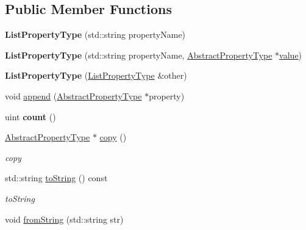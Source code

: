\subsection*{Public Member Functions}
\begin{DoxyCompactItemize}
\item 
\hypertarget{classListPropertyType_a5e6f35179b6e7c79cf7dd831db1f5ffd}{{\bfseries List\-Property\-Type} (std\-::string property\-Name)}\label{classListPropertyType_a5e6f35179b6e7c79cf7dd831db1f5ffd}

\item 
\hypertarget{classListPropertyType_a72d99362f99900b292e0a8e78e9d2d2f}{{\bfseries List\-Property\-Type} (std\-::string property\-Name, \hyperlink{classAbstractPropertyType}{Abstract\-Property\-Type} $\ast$\hyperlink{classAbstractPropertyType_ae723621925382263eba046fa1ca8e36d}{value})}\label{classListPropertyType_a72d99362f99900b292e0a8e78e9d2d2f}

\item 
\hypertarget{classListPropertyType_a97b74dbcac25f0ea6610bfea24916ef6}{{\bfseries List\-Property\-Type} (\hyperlink{classListPropertyType}{List\-Property\-Type} \&other)}\label{classListPropertyType_a97b74dbcac25f0ea6610bfea24916ef6}

\item 
void \hyperlink{classListPropertyType_a18501d9e46af59ee269c6c6473ff0c99}{append} (\hyperlink{classAbstractPropertyType}{Abstract\-Property\-Type} $\ast$property)
\item 
\hypertarget{classListPropertyType_a03589ed61592cf3061542b73abf00c67}{uint {\bfseries count} ()}\label{classListPropertyType_a03589ed61592cf3061542b73abf00c67}

\item 
\hyperlink{classAbstractPropertyType}{Abstract\-Property\-Type} $\ast$ \hyperlink{classListPropertyType_a2b4d928c8fa6c7317a31d4aa376908d1}{copy} ()
\begin{DoxyCompactList}\small\item\em copy \end{DoxyCompactList}\item 
std\-::string \hyperlink{classListPropertyType_a7c0f0a4ab1d1ceaf4d7abfbdade7f5ea}{to\-String} () const 
\begin{DoxyCompactList}\small\item\em to\-String \end{DoxyCompactList}\item 
\hypertarget{classListPropertyType_aa49d1bc6968d7201b4d836b5049133f0}{void \hyperlink{classListPropertyType_aa49d1bc6968d7201b4d836b5049133f0}{from\-String} (std\-::string str)}\label{classListPropertyType_aa49d1bc6968d7201b4d836b5049133f0}


\end{DoxyCompactItemize}
